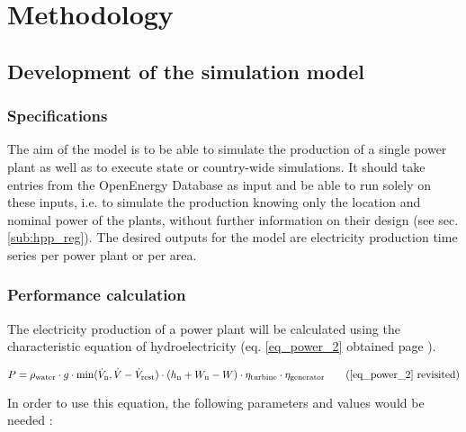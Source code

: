 \chapter{Methodology}
\label{chap:methodology}

\section{Development of the simulation model}

\subsection{Specifications}
\label{sub:spec}

The aim of the model is to be able to simulate the production of a single power plant as well as to execute state or country-wide simulations. It should take entries from the OpenEnergy Database as input and be able to run solely on these inputs, i.e. to simulate the production knowing only the location and nominal power of the plants, without further information on their design (see sec. \ref{sub:hpp_reg}). 
The desired outputs for the model are electricity production time series per power plant or per area.


\subsection{Performance calculation}
\label{sub:perf_calc}

The electricity production of a power plant will be calculated using the characteristic equation of hydroelectricity (eq. \ref{eq_power_2} obtained page \pageref{eq_power_2}).

\begin{equation*}
 P = \rho_\mathrm{water} \cdot g \cdot \min(\dot{V}_\mathrm{n},\dot{V}-\dot{V}_\mathrm{rest}) \cdot (h_\mathrm{n} +W_\mathrm{n}-W) \cdot \eta_\mathrm{turbine} \cdot \eta_\mathrm{generator}\tag{\ref{eq_power_2} revisited}
\end{equation*}

In order to use this equation, the following parameters and values would be needed : 

